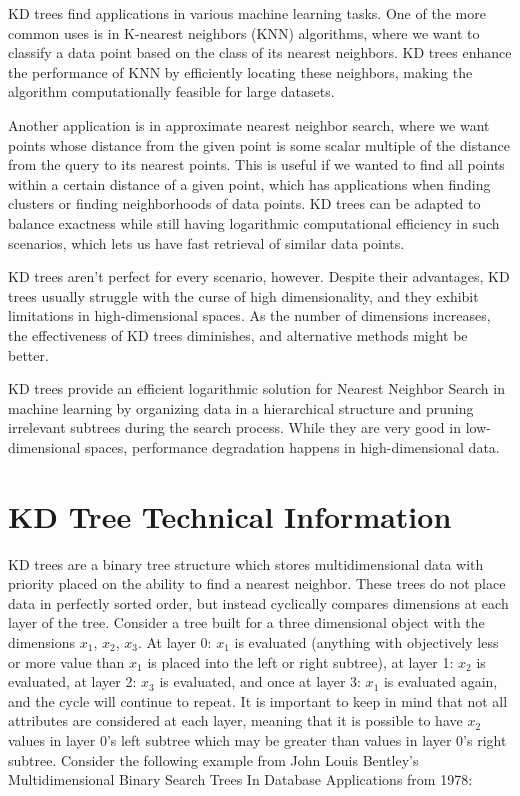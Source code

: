 \documentclass{article}
\begin{document}
KD trees find applications in various machine learning tasks. One of the more common uses is in K-nearest neighbors (KNN) algorithms, where we want to classify a data point based on the class of its nearest neighbors. KD trees enhance the performance of KNN by efficiently locating these neighbors, making the algorithm computationally feasible for large datasets.

Another application is in approximate nearest neighbor search, where we want points whose distance from the given point is some scalar multiple of the distance from the query to its nearest points. This is useful if we wanted to find all points within a certain distance of a given point, which has applications when finding clusters or finding neighborhoods of data points. KD trees can be adapted to balance exactness while still having logarithmic computational efficiency in such scenarios, which lets us have fast retrieval of similar data points.

KD trees aren't perfect for every scenario, however. Despite their advantages, KD trees usually struggle with the curse of high dimensionality, and they exhibit limitations in high-dimensional spaces. As the number of dimensions increases, the effectiveness of KD trees diminishes, and alternative methods might be better.

KD trees provide an efficient logarithmic solution for Nearest Neighbor Search in machine learning by organizing data in a hierarchical structure and pruning irrelevant subtrees during the search process. While they are very good in low-dimensional spaces, performance degradation happens in high-dimensional data.

    \section*{KD Tree Technical Information}
KD trees are a binary tree structure which stores multidimensional data with priority placed on the ability to find a nearest neighbor. These trees do not place data in perfectly sorted order, but instead cyclically compares dimensions at each layer of the tree. Consider a tree built for a three dimensional object with the dimensions $x_1$, $x_2$, $x_3$. At layer 0: $x_1$ is evaluated (anything with objectively less or more value than $x_1$ is placed into the left or right subtree), at layer 1: $x_2$ is evaluated, at layer 2: $x_3$ is evaluated, and once at layer 3: $x_1$ is evaluated again, and the cycle will continue to repeat. It is important to keep in mind that not all attributes are considered at each layer, meaning that it is possible to have $x_2$ values in layer 0’s left subtree which may be greater than values in layer 0’s right subtree. Consider the following example from John Louis Bentley’s Multidimensional Binary Search Trees In Database Applications from 1978:
\end{document}
